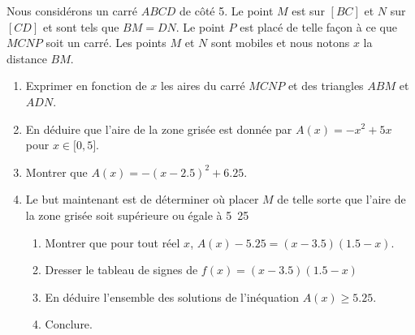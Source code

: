 
\begin{exercice}\label{exosmath-0654}

%   


    Nous considérons un carré \( ABCD\) de côté \unit{5}{\centi\meter}. Le point \( M\) est sur \( [BC]\) et \( N\) sur \( [CD]\) et sont tels que \( BM=DN\). Le point \( P\) est placé de telle façon à ce que \( MCNP\) soit un carré. Les points \( M\) et \( N\) sont mobiles et nous notons \( x\) la distance \( BM\).

    \begin{center}
   
    \end{center}

    \begin{enumerate}
        \item
            Exprimer en fonction de \( x\) les aires du carré \( MCNP\) et des triangles \( ABM\) et \( ADN\).
        \item
            En déduire que l'aire de la zone grisée est donnée par \( A(x)=-x^2+5x\) pour \( x\in\mathopen[ 0 , 5 \mathclose]\).
        \item
            Montrer que \( A(x)=-(x-2.5)^2+6.25\).
        \item
            Le but maintenant est de déterminer où placer \( M\) de telle sorte que l'aire de la zone grisée soit supérieure ou égale à \unit{5.25}{\centi\meter\squared}
            \begin{enumerate}
                \item
                    Montrer que pour tout réel \( x\), \( A(x)-5.25=(x-3.5)(1.5-x)\).
                \item
                    Dresser le tableau de signes de \( f(x)=(x-3.5)(1.5-x)\)
                \item
                    En déduire l'ensemble des solutions de l'inéquation \( A(x)\geq 5.25\).
                \item
                    Conclure.
            \end{enumerate}
    \end{enumerate}

\end{exercice}
